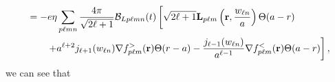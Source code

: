 \documentclass{article}
\begin{document}
\begin{equation}
\begin{split}
&= -e\eta\sum_{p\ell mn}\frac{4\pi}{\sqrt{2\ell + 1}}\mathcal{B}_{Lp\ell mn}(t)\left[\sqrt{2\ell + 1}\mathbf{L}_{p\ell m}\left(\mathbf{r},\frac{w_{\ell n}}{a}\right)\Theta(a - r) \vphantom{\frac{j_{\ell + 1}(w_{\ell n})}{a^{\ell - 1}}} \right.\\
&\qquad\left. + a^{\ell + 2}j_{\ell + 1}(w_{\ell n})\nabla f_{p\ell m}^>(\mathbf{r})\Theta(r - a) - \frac{j_{\ell - 1}(w_{\ell n})}{a^{\ell - 1}}\nabla f_{p\ell m}^<(\mathbf{r})\Theta(a - r)\right],
\end{split}
\end{equation}
we can see that
\end{document}
